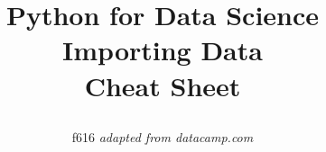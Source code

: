 \documentclass[10pt,a4paper]{article}
\title{
\raggedright
{\textbf{\color{black} Python for Data Science\\
\color{alert}Importing Data}}
\color{black}\large\\Cheat Sheet}
\author{f616 \emph{adapted from datacamp.com}}
\date{}
\begin{document}
\small
\begin{multicols}{2}

\maketitle
\thispagestyle{empty}
\scriptsize






\end{multicols}
\end{document}
